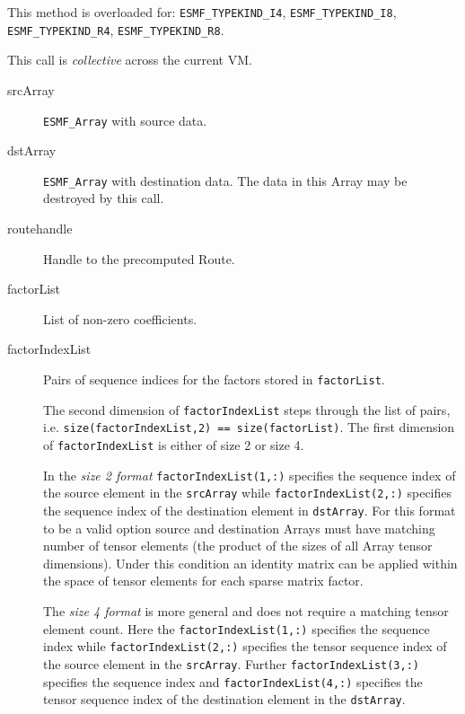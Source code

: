      This method is overloaded for:\newline
     {\tt ESMF\_TYPEKIND\_I4}, {\tt ESMF\_TYPEKIND\_I8},\newline 
     {\tt ESMF\_TYPEKIND\_R4}, {\tt ESMF\_TYPEKIND\_R8}.
  
     This call is {\em collective} across the current VM.
  
     \begin{description}
  
     \item [srcArray]
       {\tt ESMF\_Array} with source data.
  
     \item [dstArray]
       {\tt ESMF\_Array} with destination data. The data in this Array may be
       destroyed by this call.
  
     \item [routehandle]
       Handle to the precomputed Route.
  
     \item [factorList]
       List of non-zero coefficients.
  
     \item [factorIndexList]
       Pairs of sequence indices for the factors stored in {\tt factorList}.
  
       \begin{sloppypar}
       The second dimension of {\tt factorIndexList} steps through the list of
       pairs, i.e. {\tt size(factorIndexList,2) == size(factorList)}. The first
       dimension of {\tt factorIndexList} is either of size 2 or size 4.
       \end{sloppypar}
  
       In the {\em size 2 format} {\tt factorIndexList(1,:)} specifies the
       sequence index of the source element in the {\tt srcArray} while
       {\tt factorIndexList(2,:)} specifies the sequence index of the
       destination element in {\tt dstArray}. For this format to be a valid
       option source and destination Arrays must have matching number of
       tensor elements (the product of the sizes of all Array tensor dimensions).
       Under this condition an identity matrix can be applied within the space of
       tensor elements for each sparse matrix factor.
  
       \begin{sloppypar}
       The {\em size 4 format} is more general and does not require a matching
       tensor element count. Here the {\tt factorIndexList(1,:)} specifies the
       sequence index while {\tt factorIndexList(2,:)} specifies the tensor
       sequence index of the source element in the {\tt srcArray}. Further
       {\tt factorIndexList(3,:)} specifies the sequence index and
       {\tt factorIndexList(4,:)} specifies the tensor sequence index of the 
       destination element in the {\tt dstArray}.
       \end{sloppypar}
  

\end{description}
